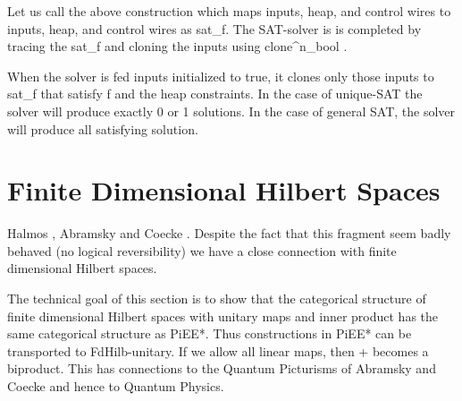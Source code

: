 \documentclass[preprint]{sigplanconf}
\newcommand{\xcomment}[2]{\textbf{#1:~\textsl{#2}}}
\newcommand{\roshan}[1]{\xcomment{Roshan}{#1}}
\begin{document}
\begin{center}
\end{center}  


Let us call the above construction which maps inputs, heap, and
control wires to inputs, heap, and control wires as {{sat_f}}. The
SAT-solver is is completed by tracing the {{sat_f}} and cloning the
inputs using {{clone^n_{bool} }}.

\begin{center}
\end{center}

When the solver is fed inputs initialized to {{true}}, it clones only
those inputs to {{sat_f}} that satisfy {{f}} and the heap
constraints. In the case of unique-SAT the solver will produce exactly
0 or 1 solutions. In the case of general SAT, the solver will produce
all satisfying solution. 


\section{Finite Dimensional Hilbert Spaces}

Halmos \cite{halmos1958finite}, Abramsky and Coecke
\cite{abramsky2004categorical}. Despite the fact that this fragment
seem badly behaved (no logical reversibility) we have a close
connection with finite dimensional Hilbert spaces.

The technical goal of this section is to show that the categorical
structure of finite dimensional Hilbert spaces with unitary maps and
inner product has the same categorical structure as {{PiEE*}}. Thus
constructions in {{PiEE*}} can be transported to FdHilb-unitary. If we
allow all linear maps, then {{+}} becomes a biproduct.  This has
connections to the Quantum Picturisms of Abramsky and Coecke and hence
to Quantum Physics.
\end{document}
